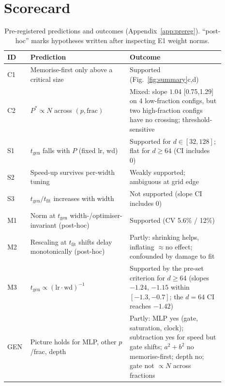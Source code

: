 \documentclass{article} %
\newcommand{\tfit}{t_{\mathrm{fit}}}
\newcommand{\tgen}{t_{\mathrm{gen}}}
\begin{document}
\section{Scorecard}
\begin{table}[t]
\caption{Pre-registered predictions and outcomes (Appendix~\ref{app:prereg}). ``post-hoc'' marks hypotheses written after inspecting E1 weight norms.}
\label{tab:score}
\begin{center}\small
\begin{tabular}{p{0.07\linewidth}p{0.42\linewidth}p{0.40\linewidth}}
\toprule
ID & Prediction & Outcome\\
\midrule
C1 & Memorise-first only above a critical size & Supported (Fig.~\ref{fig:summary}c,d)\\
C2 & $P^\ast\propto N$ across $(p,\text{frac})$ & Mixed: slope $1.04$ [0.75,1.29] on 4 low-fraction configs, but two high-fraction configs have no crossing; threshold-sensitive\\
S1 & $\tgen$ falls with $P$ (fixed lr, wd) & Supported for $d\in[32,128]$; flat for $d\ge64$ (CI includes 0)\\
S2 & Speed-up survives per-width tuning & Weakly supported; ambiguous at grid edge\\
S3 & $\tgen/\tfit$ increases with width & Not supported (slope CI includes 0)\\
M1 & Norm at $\tgen$ width-/optimiser-invariant (post-hoc) & Supported (CV 5.6\% / 12\%)\\
M2 & Rescaling at $\tfit$ shifts delay monotonically (post-hoc) & Partly: shrinking helps, inflating $\approx$no effect; confounded by damage to fit\\
M3 & $\tgen\propto(\mathrm{lr\cdot wd})^{-1}$ & Supported by the pre-set criterion for $d\ge64$ (slopes $-1.24$, $-1.15$ within $[-1.3,-0.7]$; the $d{=}64$ CI reaches $-1.42$)\\
GEN & Picture holds for MLP, other $p$/frac, depth & Partly: MLP yes (gate, saturation, clock); subtraction yes for speed but gate shifts; $a^2+b^2$ no memorise-first; depth no; gate not $\propto N$ across fractions\\
\bottomrule
\end{tabular}
\end{center}
\end{table}
\end{document}
